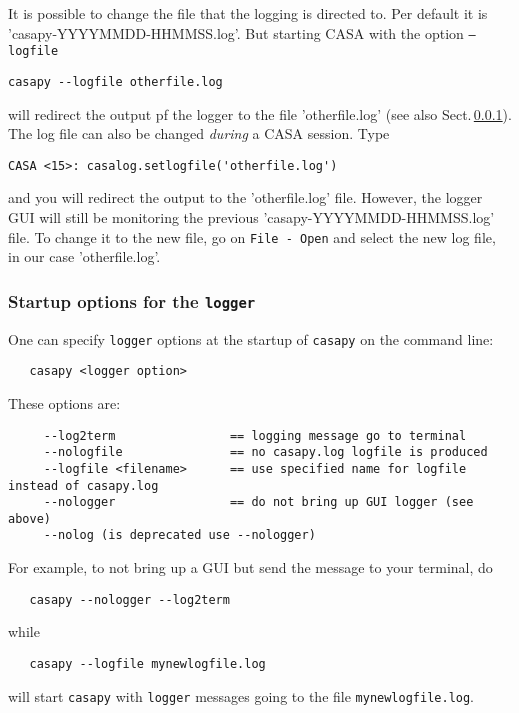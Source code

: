 It is possible to change the file that the logging is directed to. Per
default it is 'casapy-YYYYMMDD-HHMMSS.log'. But starting CASA with the option {\tt --logfile} 

\small
\begin{verbatim}
casapy --logfile otherfile.log
\end{verbatim}
\normalsize 

will redirect the output pf the logger to the file 'otherfile.log'
(see also Sect.\,\ref{section:intro.common.logger.startup}).
The log file can also be changed {\it during} a CASA session. Type 
\small
\begin{verbatim}
CASA <15>: casalog.setlogfile('otherfile.log')
\end{verbatim}
\normalsize 

and you will redirect the output to the 'otherfile.log' file.
However, the logger GUI will still be monitoring the previous
'casapy-YYYYMMDD-HHMMSS.log' file. To change it to the new file, go on {\tt File -
 Open} and select the new log file, in our case 'otherfile.log'.

\subsubsection{Startup options for the {\tt logger}}
\label{section:intro.common.logger.startup}

One can specify {\tt logger} options at the startup of {\tt casapy} on
the command line:
\small
\begin{verbatim}
   casapy <logger option>
\end{verbatim}
\normalsize

These options are:
\small
\begin{verbatim}
     --log2term                == logging message go to terminal
     --nologfile               == no casapy.log logfile is produced
     --logfile <filename>      == use specified name for logfile instead of casapy.log
     --nologger                == do not bring up GUI logger (see above)
     --nolog (is deprecated use --nologger)
\end{verbatim}
\normalsize
For example, to not bring up a GUI but send the message to your
terminal, do
\small
\begin{verbatim}
   casapy --nologger --log2term
\end{verbatim}
\normalsize
while
\small
\begin{verbatim}
   casapy --logfile mynewlogfile.log
\end{verbatim}
\normalsize
will start {\tt casapy} with {\tt logger} messages going to the file
{\tt mynewlogfile.log}.

